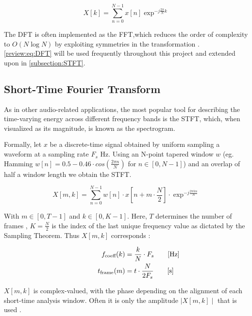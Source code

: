 \begin{equation}
  X[k] =\sum_{n=0}^{N-1} x[n] \exp^{-j \frac{2 \pi}{N} k }
  \label{review:eq:DFT}
\end{equation}

The \ac{DFT} is often implemented as the \ac{FFT},which reduces the
order of complexity to $O(N\log{N})$ by exploiting symmetries in the
transformation \cite{OppenheimDSP}. \autoref{review:eq:DFT} will be used
frequently throughout this project and extended upon in
\autoref{subsection:STFT}.

\subsection{Short-Time Fourier Transform}
\label{subsection:STFT}

As in other audio-related applications, the most popular tool for describing the
time-varying energy across different frequency bands is the \ac{STFT}, which,
when visualized as its magnitude, is known as the spectrogram.

Formally, let $x$ be a discrete-time signal obtained by uniform sampling a
waveform at a sampling rate $F_{s}$ Hz. Using an N-point tapered window $w$ (eg.
Hamming $w[n] = 0.5-0.46\cdot cos(\frac{2\pi n}{N})$ for
$n\in\left[0,N-1\right]$) and an overlap of half a window length we obtain the
STFT.

\begin{equation}
  X [m,k] = \sum_{n=0}^{N-1}w[n]\cdot x[n + m\cdot\frac{N}{2}]\cdot \exp^{-j\frac{2\pi k n }{N}}
\end{equation}

With $m\in\left[0,T-1\right]$ and $k\in\left[0,K-1\right]$. Here, $T$ determines
the number of frames , $K = \frac{N}{2}$ is the index of the last unique
frequency value as dictated by the Sampling Theorem. Thus $X[m,k]$ corresponds :

\begin{equation}
  \begin{aligned}
    f_{\text{coeff}}(k) & = \frac{k}{N} \cdot F_{s} \mathrlap{\qquad [\si{\hertz}]}   \\
    t_{\text{frame}}(m) & = t \cdot \frac{N}{2F_{s}} \mathrlap{\qquad [\si{\second}]}
  \end{aligned}
  \label{review:eq:tradeoff}
\end{equation}

$X[m,k]$ is complex-valued, with the phase depending on the alignment of each
short-time analysis window. Often it is only the amplitude $\mid X[m,k] \mid$
that is used \cite{OppenheimDSP}.

